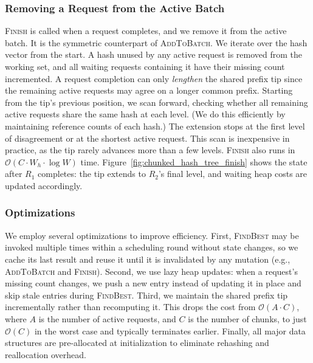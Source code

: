 \vspace{-5pt}

\subsubsection*{Removing a Request from the Active Batch}
\textsc{Finish} is called when a request completes, and we remove it from the active batch. It is the symmetric counterpart of \textsc{AddToBatch}. We iterate over the hash vector from the start. A hash unused by any active request is removed from the working set, and all waiting requests containing it have their missing count incremented. A request completion can only \textit{lengthen} the shared prefix tip since the remaining active requests may agree on a longer common prefix. Starting from the tip's previous position, we scan forward, checking whether all remaining active requests share the same hash at each level. (We do this efficiently by maintaining reference counts of each hash.) The extension stops at the first level of disagreement or at the shortest active request. This scan is inexpensive in practice, as the tip rarely advances more than a few levels. \textsc{Finish} also runs in $\mathcal{O}(C \cdot W_h \cdot \log W)$ time. Figure~\ref{fig:chunked_hash_tree_finish} shows the state after $R_1$ completes: the tip extends to $R_2$'s final level, and waiting heap costs are updated accordingly. 

\vspace{-5pt}

\subsubsection*{Optimizations}
We employ several optimizations to improve efficiency. First, \textsc{FindBest} may be invoked multiple times within a scheduling round without state changes, so we cache its last result and reuse it until it is invalidated by any mutation (e.g., \textsc{AddToBatch} and \textsc{Finish}). Second, we use lazy heap updates: when a request's missing count changes, we push a new entry instead of updating it in place and skip stale entries during \textsc{FindBest}. Third, we maintain the shared prefix tip incrementally rather than recomputing it. This drops the cost from $\mathcal{O}(A \cdot C)$, where $A$ is the number of active requests, and $C$ is the number of chunks, to just $\mathcal{O}(C)$ in the worst case and typically terminates earlier. Finally, all major data structures are pre-allocated at initialization to eliminate rehashing and reallocation overhead. 

